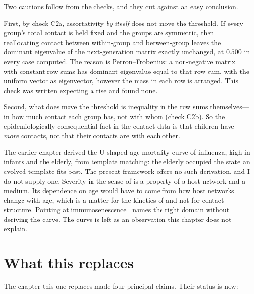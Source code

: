 Two cautions follow from the checks, and they cut against an easy
conclusion.

First, by check C2a, assortativity \emph{by itself} does not move the
threshold. \lnkC{} If every group's total contact is held fixed and the
groups are symmetric, then reallocating contact between within-group and
between-group leaves the dominant eigenvalue of the next-generation matrix
exactly unchanged, at $0.500$ in every case computed. The reason is
Perron--Frobenius: a non-negative matrix with constant row sums has
dominant eigenvalue equal to that row sum, with the uniform vector as
eigenvector, however the mass in each row is arranged. \lnkD{} This check
was written expecting a rise and found none.

Second, what does move the threshold is inequality in the row sums
themselves---in how much contact each group has, not with whom
(check C2b). So the epidemiologically consequential fact in the contact data
is that children have \emph{more} contacts, not that their contacts are with
each other.

\begin{remark}
\label{sm:rem-ushape}
The earlier chapter derived the U-shaped age-mortality curve of influenza,
high in infants and the elderly, from template matching: the elderly
occupied the state an evolved template fits best. The present framework
offers no such derivation, and I do not supply one. Severity in the sense of
 is a property of a host network and a medium. Its
dependence on age would have to come from how host networks change with
age, which is a matter for the kinetics of  and not for
contact structure. Pointing at immunosenescence~\citep{goronzy2013understanding} names
the right domain without deriving the curve. The curve is left as an
observation this chapter does not explain.
\end{remark}

\section{What this replaces}
\label{sm:sec:replaces}

The chapter this one replaces made four principal claims. Their status is
now:

